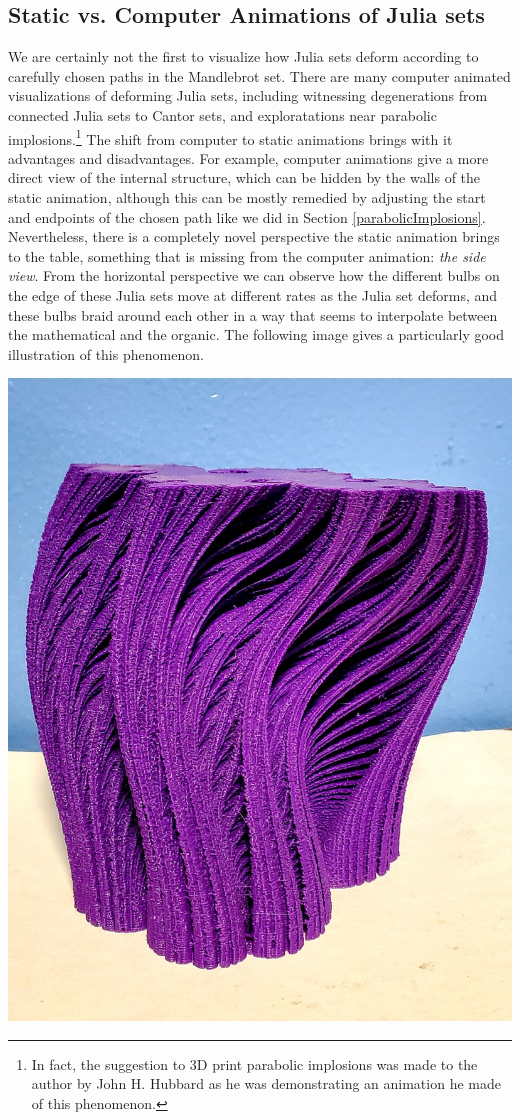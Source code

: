 \documentclass[12 pt]{article}
\begin{document}
\subsection{Static vs. Computer Animations of Julia sets}
We are certainly not the first to visualize how Julia sets deform according to carefully chosen paths in the Mandlebrot set.  There are many computer animated visualizations of deforming Julia sets, including witnessing degenerations from connected Julia sets to Cantor sets, and exploratations near parabolic implosions.\footnote{In fact, the suggestion to 3D print parabolic implosions was made to the author by John H. Hubbard as he was demonstrating an animation he made of this phenomenon.}  The shift from computer to static animations brings with it advantages and disadvantages.  For example, computer animations give a more direct view of the internal structure, which can be hidden by the walls of the static animation, although this can be mostly remedied by adjusting the start and endpoints of the chosen path like we did in Section \ref{parabolicImplosions}.   Nevertheless, there is a completely novel perspective the static animation brings to the table, something that is missing from the computer animation: \textit{the side view}.  From the horizontal perspective we can observe how the different bulbs on the edge of these Julia sets move at different rates as the Julia set deforms, and these bulbs braid around each other in a way that seems to interpolate between the mathematical and the organic.  The following image gives a particularly good illustration of this phenomenon.
\begin{center}
    \includegraphics[width=.825\textwidth]{images/JuliaDef7.jpg}
\end{center}
\end{document}
